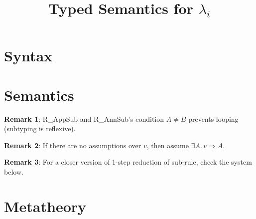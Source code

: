 \documentclass[oneside,a4paper]{article}
\title{\bf Typed Semantics for $\lambda_i$}
\author{}
\date{}
\numberwithin{equation}{section}
\begin{document}
\maketitle

\section{Syntax}
\begin{small}
\begin{spacing}{0.4}
\gram{
  \otte\ottinterrule
}
\end{spacing}
\end{small}

\section{Semantics}
\begin{spacing}{0.4}
\begin{small}
\noindent
\ottdefntypedvalinf{}\ottinterrule
\ottdefntypedvalchk{}\ottinterrule
\ottdefnreductioninf{}\ottinterrule
\ottdefnreductionchk{}\ottinterrule
\end{small}
\end{spacing}
\noindent\textbf{Remark 1}:
R\_AppSub and R\_AnnSub's condition $A \neq B$ prevents looping 
        (subtyping is reflexive).

\noindent\textbf{Remark 2}:
If there are no assumptions over $v$, then assume $\exists A.\, v \Rightarrow A$. 

\noindent\textbf{Remark 3}:
For a closer version of 1-step reduction of sub-rule, check the system below. 

\newpage
\section{Metatheory}
\end{document}

